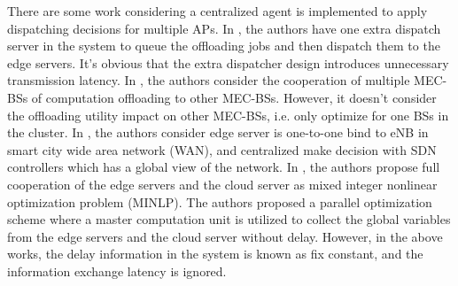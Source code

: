 
There are some work considering a centralized agent is implemented to apply dispatching decisions for multiple APs.
In \cite{IOTJ19-CaoJ}, the authors have one extra dispatch server in the system to queue the offloading jobs and then dispatch them to the edge servers.
It's obvious that the extra dispatcher design introduces unnecessary transmission latency.
In \cite{Fan2017}, the authors consider the cooperation of multiple MEC-BSs of computation offloading to other MEC-BSs. However, it doesn't consider the offloading utility impact on other MEC-BSs, i.e. only optimize for one BSs in the cluster.
In \cite{JSAC19-AlameddineHA}, the authors consider edge server is one-to-one bind to eNB in smart city wide area network (WAN), and centralized make decision with SDN controllers which has a global view of the network.
In \cite{TVT19-WangY}, the authors propose full cooperation of the edge servers and the cloud server as mixed integer nonlinear optimization problem (MINLP).
The authors proposed a parallel optimization scheme where a master computation unit is utilized to collect the global variables from the edge servers and the cloud server without delay. 
However, in the above works, the delay information in the system is known as fix constant, and the information exchange latency is ignored.


